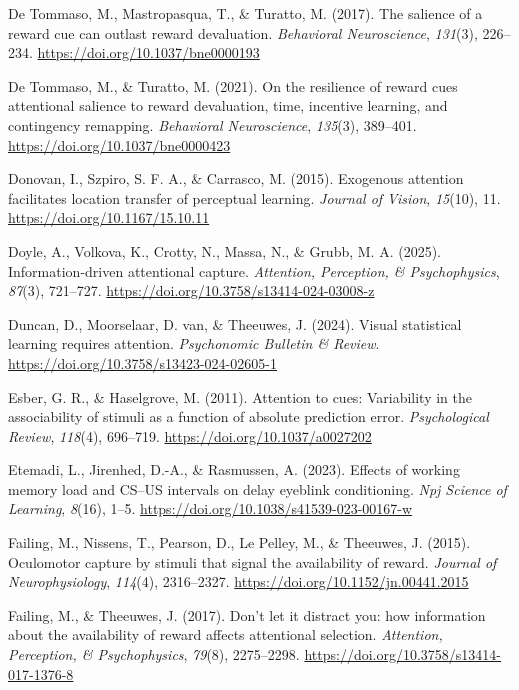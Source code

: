 \documentclass[
  man,
  floatsintext,
  longtable,
  nolmodern,
  notxfonts,
  notimes,
  mask,
  colorlinks=true,linkcolor=blue,citecolor=blue,urlcolor=blue]{apa7}
\newlength{\cslhangindent}
\newenvironment{CSLReferences}[2] %
 {\begin{list}{}{%
  \setlength{\itemindent}{0pt}
  \setlength{\leftmargin}{0pt}
  \setlength{\parsep}{0pt}
  \ifodd #1
   \setlength{\leftmargin}{\cslhangindent}
   \setlength{\itemindent}{-1\cslhangindent}
  \fi
  \setlength{\itemsep}{#2\baselineskip}}}
 {\end{list}}
\begin{document}
\begin{CSLReferences}{1}{0}
De Tommaso, M., Mastropasqua, T., \& Turatto, M. (2017). The salience of
a reward cue can outlast reward devaluation. \emph{Behavioral
Neuroscience}, \emph{131}(3), 226--234.
\url{https://doi.org/10.1037/bne0000193}

De Tommaso, M., \& Turatto, M. (2021). On the resilience of reward cues
attentional salience to reward devaluation, time, incentive learning,
and contingency remapping. \emph{Behavioral Neuroscience},
\emph{135}(3), 389--401. \url{https://doi.org/10.1037/bne0000423}

Donovan, I., Szpiro, S. F. A., \& Carrasco, M. (2015). Exogenous
attention facilitates location transfer of perceptual learning.
\emph{Journal of Vision}, \emph{15}(10), 11.
\url{https://doi.org/10.1167/15.10.11}

Doyle, A., Volkova, K., Crotty, N., Massa, N., \& Grubb, M. A. (2025).
Information-driven attentional capture. \emph{Attention, Perception, \&
Psychophysics}, \emph{87}(3), 721--727.
\url{https://doi.org/10.3758/s13414-024-03008-z}

Duncan, D., Moorselaar, D. van, \& Theeuwes, J. (2024). Visual
statistical learning requires attention. \emph{Psychonomic Bulletin \&
Review}. \url{https://doi.org/10.3758/s13423-024-02605-1}

Esber, G. R., \& Haselgrove, M. (2011). Attention to cues: Variability
in the associability of stimuli as a function of absolute prediction
error. \emph{Psychological Review}, \emph{118}(4), 696--719.
\url{https://doi.org/10.1037/a0027202}

Etemadi, L., Jirenhed, D.-A., \& Rasmussen, A. (2023). Effects of
working memory load and {CS}--{US} intervals on delay eyeblink
conditioning. \emph{Npj Science of Learning}, \emph{8}(16), 1--5.
\url{https://doi.org/10.1038/s41539-023-00167-w}

Failing, M., Nissens, T., Pearson, D., Le Pelley, M., \& Theeuwes, J.
(2015). Oculomotor capture by stimuli that signal the availability of
reward. \emph{Journal of Neurophysiology}, \emph{114}(4), 2316--2327.
\url{https://doi.org/10.1152/jn.00441.2015}

Failing, M., \& Theeuwes, J. (2017). Don{'}t let it distract you: how
information about the availability of reward affects attentional
selection. \emph{Attention, Perception, \& Psychophysics}, \emph{79}(8),
2275--2298. \url{https://doi.org/10.3758/s13414-017-1376-8}


\end{CSLReferences}
\end{document}
